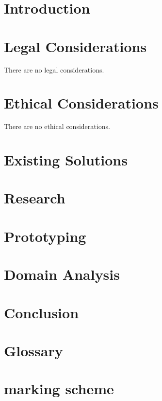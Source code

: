\documentclass[a4paper,12pt]{report}
\begin{document}
\chapter{Introduction}

\chapter{Legal Considerations}
There are no legal considerations.
\chapter{Ethical Considerations}
There are no ethical considerations.
\chapter{Existing Solutions}

\chapter{Research}

\chapter{Prototyping}

\chapter{Domain Analysis}

\chapter{Conclusion}


\printbibliography[heading=bibintoc]

\appendix
\chapter{Glossary}
\printglossaries
\chapter{marking scheme}
%
\end{document}
